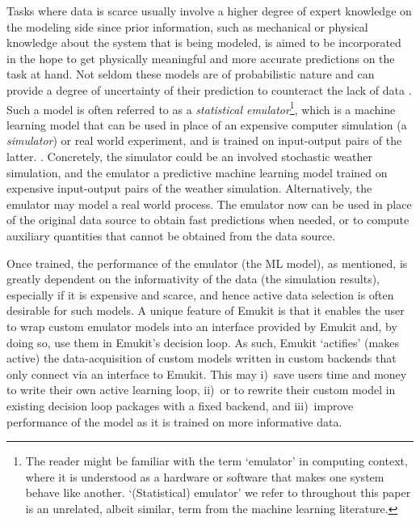 Tasks where data is scarce usually involve a higher degree of expert knowledge on the modeling side since prior information, such as mechanical or physical knowledge about the system that is being modeled, is aimed to be incorporated in the hope to get physically meaningful and more accurate predictions on the task at hand. Not seldom these models are of probabilistic nature and can provide a degree of uncertainty of their prediction to counteract the lack of data \cite{RasmussenWilliams2006, Ho1995, MacKay1991APB, Bernardo1998}. Such a model is often referred to as a \emph{statistical emulator}\footnote{The reader might be familiar with the term `emulator' in computing context, where it is understood as a hardware or software that makes one system behave like another. `(Statistical) emulator' we refer to throughout this paper is an unrelated, albeit similar, term from the machine learning literature. }, which is a machine learning model that can be used in place of an expensive computer simulation (a \emph{simulator}) or real world experiment, and is trained on input-output pairs of the latter. \cite{Kennedy2000, Kennedy2001, Conti2009, Conti2010}. Concretely, the simulator could be an involved stochastic weather simulation, and the emulator a predictive machine learning model trained on expensive input-output pairs of the weather simulation. Alternatively, the emulator may model a real world process. The emulator now can be used in place of the original data source to obtain fast predictions when needed, or to compute auxiliary quantities that cannot be obtained from the data source.

Once trained, the performance of the emulator (the ML model), as mentioned, is greatly dependent on the informativity of the data (the simulation results), especially if it is expensive and scarce, and hence active data selection is often desirable for such models. A unique feature of Emukit is that it enables the user to wrap custom emulator models into an interface provided by Emukit and, by doing so, use them in Emukit's decision loop. As such, Emukit `actifies' (makes active) the data-acquisition of custom models written in custom backends that only connect via an interface to Emukit. This may i)~save users time and money to write their own active learning loop, ii)~or to rewrite their custom model in existing decision loop packages with a fixed backend, and iii)~improve performance of the model as it is trained on more informative data.

